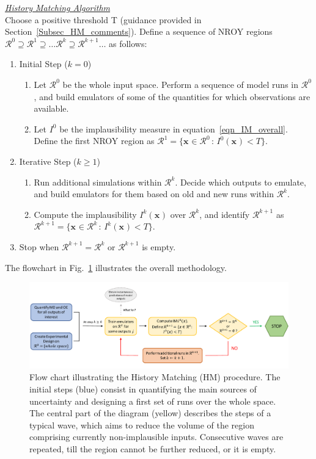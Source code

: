 \documentclass[preprint,12pt, sort&compress]{elsarticle}
\newcommand{\bd}[1]{\boldsymbol{#1}}
\newcommand{\x}[1][]{\bd{x_{#1}}}
\newcommand{\R}[1][]{\mathcal{R}^{#1}}
\begin{document}
\noindent
\underline{\it History Matching Algorithm}\\[1.5ex]
Choose a positive threshold T (guidance provided in Section~\ref{Subsec_HM_comments}). Define a sequence of NROY regions $\R[0]\supseteq \R[1]\supseteq \dots \R[k]\supseteq \R[k+1] \dots $ as follows:
\begin{enumerate}
\item 	Initial Step ($k=0$)
\begin{enumerate}
\item Let $\R[0]$ be the whole input space. Perform a sequence of model runs in $\R[0]$, and build emulators of some of the quantities for which observations are available.
\item Let $I^0$ be the implausibility measure in equation~\eqref{eqn_IM_overall}. Define the first NROY region as $\R[1] = \{ \x \in \R[0] \, : \,  I^0(\x)<T \}$.  
\end{enumerate}
\item 	Iterative Step ($k\geq1$)
\begin{enumerate}
\item 	Run additional simulations within $\R[k]$. Decide which outputs to emulate, and build emulators for them based on old and new runs within $\R[k]$. \label{point_iterative}
\item 	Compute the implausibility $I^k(\x)$ over $\R[k]$, and identify $\R[k+1]$ as $\R[k+1]=\{\x \in \R[k] \,:\, I^k(\x)<T \}$.
\end{enumerate}
\item Stop when $\R[k+1]=\R[k]$ or $\R[k+1]$ is empty.
\end{enumerate}
The flowchart in Fig.~\ref{Fig_FlowChart} illustrates the overall methodology. 

\begin{figure}
\includegraphics[width=\textwidth]{Pictures/Flow_Chart/FlowChart_Horizontal.pdf}
\caption{Flow chart illustrating the History Matching (HM) procedure. The initial steps (blue) consist in quantifying the main sources of uncertainty and designing a first set of runs over the whole space. The central part of the diagram (yellow) describes the steps of a typical wave, which aims to reduce the volume of the region comprising currently non-implausible inputs. Consecutive waves are repeated, till the region cannot be further reduced, or it is empty.}
\label{Fig_FlowChart}
\end{figure}
\end{document}
